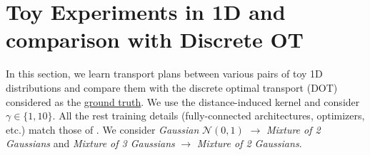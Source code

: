 \documentclass{article} %
\begin{document}



\clearpage
\section{Toy Experiments in 1D and comparison with Discrete OT}
\label{sec-toy-1D}

\vspace{-2mm}In this section, we learn transport plans between various pairs of toy 1D distributions and compare them with the discrete optimal transport (DOT) considered as the \underline{ground truth}. We use the distance-induced kernel and consider $\gamma\in \{1,10\}$. All the rest training details (fully-connected architectures, optimizers, etc.) match those of \citep[Appendix C]{korotin2023neural}. We consider \textit{Gaussian} $\mathcal{N}(0,1)$ $\rightarrow$ \textit{Mixture of 2 Gaussians} and \textit{Mixture of 3 Gaussians} $\rightarrow$ \textit{Mixture of 2 Gaussians}.
\end{document}
